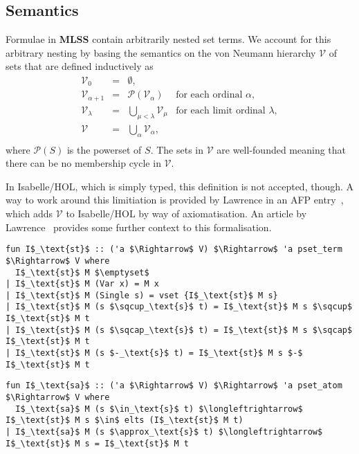 \documentclass[sigplan,10pt,anonymous,review]{acmart}
\begin{document}
\subsection{Semantics}
Formulae in \textbf{MLSS} contain arbitrarily nested set terms.
We account for this arbitrary nesting by basing the semantics on the von Neumann hierarchy $\mathcal{V}$ of sets that are defined inductively as
  \[
    \begin{array}{rclr}
      \mathcal{V}_0 & = & \emptyset, \\
      \mathcal{V}_{\alpha + 1} & = & \mathcal{P}(\mathcal{V}_\alpha) & \text{for each ordinal $\alpha$}, \\
      \mathcal{V}_{\lambda} & = & \bigcup_{\mu < \lambda} \mathcal{V}_\mu & \text{for each limit ordinal $\lambda$}, \\
      \mathcal{V} & = & \bigcup_\alpha \mathcal{V}_\alpha, \\
    \end{array}
  \]
where $\mathcal{P}(S)$ is the powerset of $S$.
The sets in $\mathcal{V}$ are well-founded meaning that there can be no membership cycle in $\mathcal{V}$.

In Isabelle/HOL, which is simply typed, this definition is not accepted, though.
A way to work around this limitiation is provided by Lawrence in an AFP entry~\cite{zfc_in_hol_afp}, which adds $\mathcal{V}$ to Isabelle/HOL by way of axiomatisation.
An article by Lawrence~\cite{zfc_in_hol_afp} provides some further context to this formalisation.


\begin{lstlisting}
fun I$_\text{st}$ :: ('a $\Rightarrow$ V) $\Rightarrow$ 'a pset_term $\Rightarrow$ V where
  I$_\text{st}$ M $\emptyset$
| I$_\text{st}$ M (Var x) = M x
| I$_\text{st}$ M (Single s) = vset {I$_\text{st}$ M s}
| I$_\text{st}$ M (s $\sqcup_\text{s}$ t) = I$_\text{st}$ M s $\sqcup$ I$_\text{st}$ M t 
| I$_\text{st}$ M (s $\sqcap_\text{s}$ t) = I$_\text{st}$ M s $\sqcap$ I$_\text{st}$ M t 
| I$_\text{st}$ M (s $-_\text{s}$ t) = I$_\text{st}$ M s $-$ I$_\text{st}$ M t 
\end{lstlisting}

\begin{lstlisting}
fun I$_\text{sa}$ :: ('a $\Rightarrow$ V) $\Rightarrow$ 'a pset_atom $\Rightarrow$ V where
  I$_\text{sa}$ M (s $\in_\text{s}$ t) $\longleftrightarrow$ I$_\text{st}$ M s $\in$ elts (I$_\text{st}$ M t)
| I$_\text{sa}$ M (s $\approx_\text{s}$ t) $\longleftrightarrow$ I$_\text{st}$ M s = I$_\text{st}$ M t
\end{lstlisting}
\end{document}
